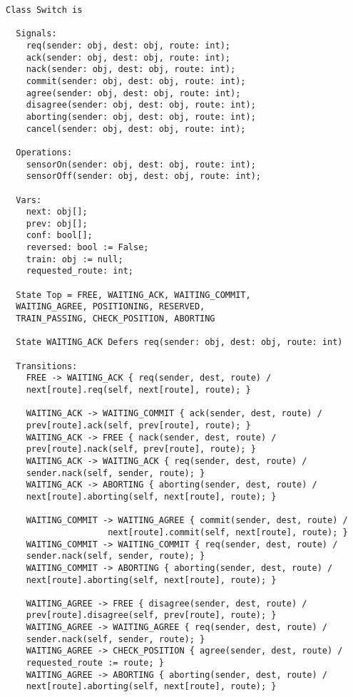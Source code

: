 \begin{lstlisting}[caption={modello della classe Switch}]
Class Switch is

  Signals:
    req(sender: obj, dest: obj, route: int);        
    ack(sender: obj, dest: obj, route: int);
    nack(sender: obj, dest: obj, route: int);
    commit(sender: obj, dest: obj, route: int);
    agree(sender: obj, dest: obj, route: int);
    disagree(sender: obj, dest: obj, route: int);
    aborting(sender: obj, dest: obj, route: int);
    cancel(sender: obj, dest: obj, route: int);

  Operations:
    sensorOn(sender: obj, dest: obj, route: int);  
    sensorOff(sender: obj, dest: obj, route: int);

  Vars:
    next: obj[];             
    prev: obj[];             
    conf: bool[];
    reversed: bool := False; 
    train: obj := null;      
    requested_route: int;         

  State Top = FREE, WAITING_ACK, WAITING_COMMIT, 
  WAITING_AGREE, POSITIONING, RESERVED, 
  TRAIN_PASSING, CHECK_POSITION, ABORTING
  
  State WAITING_ACK Defers req(sender: obj, dest: obj, route: int)

  Transitions:
    FREE -> WAITING_ACK { req(sender, dest, route) / 
    next[route].req(self, next[route], route); }

    WAITING_ACK -> WAITING_COMMIT { ack(sender, dest, route) / 
    prev[route].ack(self, prev[route], route); }
    WAITING_ACK -> FREE { nack(sender, dest, route) / 
    prev[route].nack(self, prev[route], route); }
    WAITING_ACK -> WAITING_ACK { req(sender, dest, route) / 
    sender.nack(self, sender, route); }
    WAITING_ACK -> ABORTING { aborting(sender, dest, route) / 
    next[route].aborting(self, next[route], route); }

    WAITING_COMMIT -> WAITING_AGREE { commit(sender, dest, route) / 
    				next[route].commit(self, next[route], route); }
    WAITING_COMMIT -> WAITING_COMMIT { req(sender, dest, route) / 
    sender.nack(self, sender, route); }
    WAITING_COMMIT -> ABORTING { aborting(sender, dest, route) / 
    next[route].aborting(self, next[route], route); }

    WAITING_AGREE -> FREE { disagree(sender, dest, route) / 
    prev[route].disagree(self, prev[route], route); }
    WAITING_AGREE -> WAITING_AGREE { req(sender, dest, route) / 
    sender.nack(self, sender, route); }
    WAITING_AGREE -> CHECK_POSITION { agree(sender, dest, route) / 
    requested_route := route; }
    WAITING_AGREE -> ABORTING { aborting(sender, dest, route) / 
    next[route].aborting(self, next[route], route); }


\end{lstlisting}
